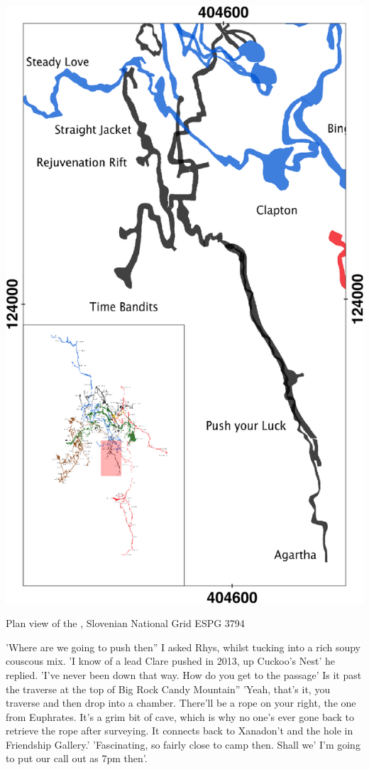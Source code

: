  \begin{marginfigure}
\checkoddpage \ifoddpage \forcerectofloat \else \forceversofloat \fi
\centering
 \includegraphics[width=\linewidth]{images/2015/tanguy-push-2015/push_your_luck_inset}
 \caption{Plan view of the \protect{}, Slovenian National Grid ESPG 3794}
 \label{push your luck inset}
\end{marginfigure}

'Where are we going to push then'' I asked Rhys, whilst tucking into a rich soupy couscous mix. 
'I know of a lead Clare pushed in 2013, up Cuckoo's Nest' he replied. 
'I've never been down that way. How do you get to the passage' Is it past the traverse at the top of Big Rock Candy Mountain''
'Yeah, that's it, you traverse and then drop into a chamber. There'll be a rope on your right, the one from Euphrates. It's a grim bit of cave, which is why no one's ever gone back to retrieve the rope after surveying. It connects back to Xanadon't and the hole in Friendship Gallery.'
'Fascinating, so fairly close to camp then. Shall we' I'm going to put our call out as 7pm then'. 

